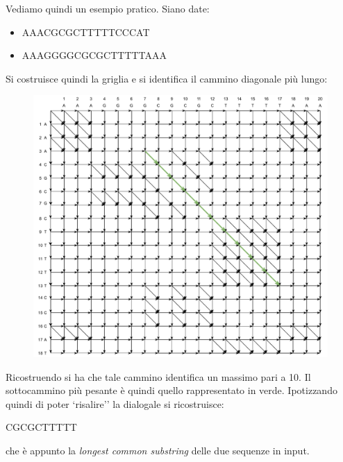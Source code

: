 \documentclass[a4paper,12pt, oneside]{book}
\begin{document}
Vediamo quindi un esempio pratico. Siano date:
\begin{itemize}
  \item AAACGCGCTTTTTCCCAT
  \item AAAGGGGCGCGCTTTTTAAA
\end{itemize}
\newpage
Si costruisce quindi la griglia e si identifica il cammino diagonale più lungo:
\begin{figure}[H]
  \centering
  \includegraphics[scale = 0.62]{img/es4.pdf}
\end{figure}
Ricostruendo si ha che tale cammino identifica un massimo pari a 10. Il
sottocammino più pesante è quindi quello rappresentato in verde. Ipotizzando
quindi di poter `risalire'' la dialogale si
ricostruisce: 
\begin{center}
  CGCGCTTTTT
\end{center}
che è appunto la \textit{longest common substring} delle due sequenze in input.
\end{document}
